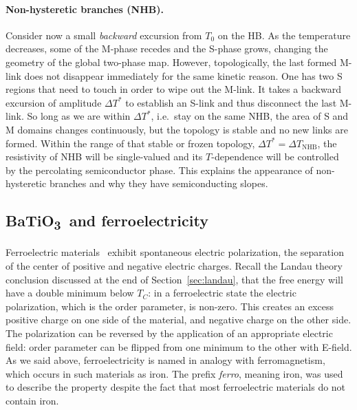 \documentclass[11pt,a4paper]{article}
\newcommand{\BTO}{BaTiO\textsubscript{3}}
\begin{document}
\paragraph{Non-hysteretic branches (NHB).}
Consider now a small \emph{backward} excursion from $T_0$ on the HB. As the
temperature decreases, some of the M-phase recedes and the S-phase grows, changing
the geometry of the global two-phase map. However, topologically, the last formed
M-link does not disappear immediately for the same kinetic reason. One has two S
regions that need to touch in order to wipe out the M-link. It takes a backward
excursion of amplitude $\Delta T^{*}$ to establish an S-link and thus disconnect
the last M-link. So long as we are within $\Delta T^{*}$, i.e.\ stay on the same
NHB, the area of S and M domains changes continuously, but the topology is stable
and no new links are formed. Within the range of that stable or frozen topology,
$\Delta T^{*} = \Delta T_{\mathrm{NHB}}$, the resistivity of NHB will be
single-valued and its $T$-dependence will be controlled by the percolating
semiconductor phase. This explains the appearance of non-hysteretic
branches and why they have semiconducting slopes.

\subsection{\BTO\ and ferroelectricity}

Ferroelectric materials~\cite{ref:gittrman,ref:papon,ref:jona,ref:blakemore,ref:umich}
exhibit spontaneous electric polarization, the separation of the center of positive
and negative electric charges. Recall the Landau theory conclusion discussed at the
end of Section~\ref{sec:landau}, that the free energy will have a double minimum
below $T_C$: in a ferroelectric state the electric polarization, which is the order
parameter, is non-zero. This creates an excess positive charge on one side of the
material, and negative charge on the other side. The polarization can be reversed
by the application of an appropriate electric field: order parameter can be
flipped from one minimum to the other with E-field. As we said above,
ferroelectricity is named in analogy with ferromagnetism, which occurs in such
materials as iron. The prefix \emph{ferro}, meaning iron, was used to describe the
property despite the fact that most ferroelectric materials do not contain iron.
\end{document}
